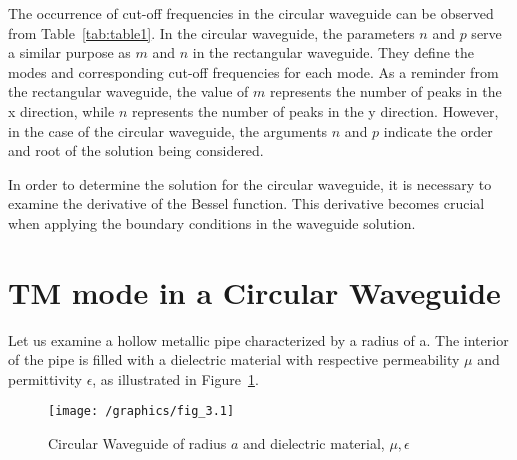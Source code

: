 The occurrence of cut-off frequencies in the circular waveguide can be observed from Table~\ref{tab:table1}. In the circular waveguide, the parameters $n$ and $p$ serve a similar purpose as $m$ and $n$ in the rectangular waveguide. They define the modes and corresponding cut-off frequencies for each mode. As a reminder from the rectangular waveguide, the value of 
$m$ represents the number of peaks in the x direction, while $n$ represents the number of peaks in the y direction. However, in the case of the circular waveguide, the arguments $n$ and $p$ indicate the order and root of the solution being considered.

In order to determine the solution for the circular waveguide, it is necessary to examine the derivative of the Bessel function. This derivative becomes crucial when applying the boundary conditions in the waveguide solution.

\section{TM mode in a Circular Waveguide}
Let us examine a hollow metallic pipe characterized by a radius of a. The interior of the pipe is filled with a dielectric material with respective permeability $\mu$ and permittivity $\epsilon$, as illustrated in Figure~\ref{fig:fig3}.
\begin{figure}[h]
\centering
\texttt{[image: /graphics/fig\_3.1]}
\caption{Circular Waveguide of radius $a$ and dielectric material, $\mu, \epsilon$}
\label{fig:fig3}
\end{figure}

